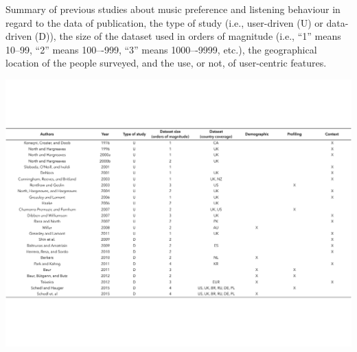 

{\captionsetup[table]{belowskip=3cm, aboveskip=0cm, skip=-2cm}
\begin{table}
    \centering
  \caption[Summary of previous studies about music preference and listening behaviour]{Summary of previous studies about music preference and listening behaviour in regard to the data of publication, the type of study (i.e., user-driven (U) or data-driven (D)), the size of the dataset used in orders of magnitude (i.e., ``1'' means 10--99, ``2'' means 100–-999, ``3'' means 1000–-9999, etc.), the geographical location of the people surveyed, and the use, or not, of user-centric features.}\label{tab:maestre}
  \includegraphics[width=1.0\linewidth]{figs/ch2/tabla_maestre.pdf}
  
\end{table}
}



